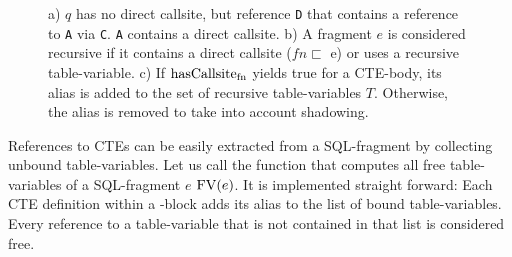 \begin{figure}[h]
    \small
    \centering
    \caption{a) $q$ has no direct callsite, but reference \texttt{D} that contains a reference to \texttt{A} via \texttt{C}. \texttt{A} contains a direct callsite. b) A fragment $e$ is considered recursive if it contains a direct callsite ($fn \sqsubset$ e) or uses a recursive table-variable. c) If $\operatorname{\text{hasCallsite}_{fn}}$ yields true for a CTE-body, its alias is added to the set of recursive table-variables $T$. Otherwise, the alias is removed to take into account shadowing.}
    \label{fig:tracking_recursive_ctes}
\end{figure}

References to CTEs can be easily extracted from a SQL-fragment by collecting unbound table-variables. Let us call the function that computes all free table-variables of a SQL-fragment $e$ $\operatorname{\text{\rm FV}}(e)$. It is implemented straight forward: Each CTE definition within a \WITH-block adds its alias to the list of bound table-variables. Every reference to a table-variable that is not contained in that list is considered free.


